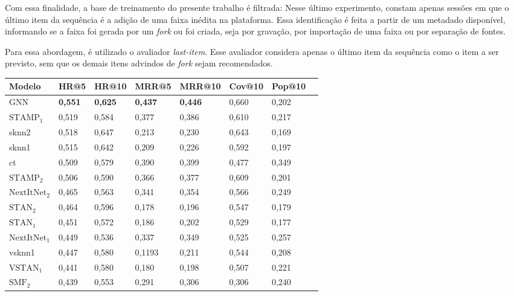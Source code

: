 Com essa finalidade, a base de treinamento do presente trabalho é filtrada:
Nesse último experimento, constam apenas sessões em que o último item da
sequência é a adição de uma faixa inédita na plataforma. Essa identificação é feita a partir
de um metadado disponível, informando se a faixa foi gerada por um \textit{fork}
ou foi criada, seja por gravação, por importação de uma faixa ou por separação
de fontes.

Para essa abordagem, é utilizado o avaliador \textit{last-item}. Esse avaliador
considera apenas o último item da sequência como o item a ser previsto, sem que
os demais itens advindos de \textit{fork} sejam recomendados.

\begin{table}[htbp]
  \small
  \centering
    \begin{tabular}{|l|l|l|l|l|l|l|l|}
      \hline
      Modelo & HR@5 & HR@10 & MRR@5 & MRR@10 & Cov@10 & Pop@10  \\
      \hline
      GNN & \textbf{0,551} & \textbf{0,625} & \textbf{0,437} & \textbf{0,446} & 0,660 & 0,202  \\
      \hline
      $\text{STAMP}_1$ & 0,519 & 0,584 & 0,377 & 0,386 & 0,610 & 0,217 \\
      \hline
      sknn2 & 0,518 & 0,647 & 0,213 & 0,230 & 0,643 & 0,169 \\
      \hline
      sknn1 & 0,515 & 0,642 & 0,209 & 0,226 & 0,592 & 0,197 \\
      \hline
      ct & 0,509 & 0,579 & 0,390 & 0,399  & 0,477 & 0,349 \\
      \hline
      $\text{STAMP}_2$ & 0,506 & 0,590 & 0,366 & 0,377 & 0,609 & 0,201 \\
      \hline
      $\text{NextItNet}_2$ & 0,465 & 0,563 & 0,341 & 0,354 & 0,566 & 0,249 \\
      \hline
      $\text{STAN}_2$ & 0,464 & 0,596 & 0,178 & 0,196 & 0,547 & 0,179 \\
      \hline
      $\text{STAN}_1$ & 0,451 & 0,572 & 0,186 & 0,202 & 0,529 & 0,177 \\
      \hline
      $\text{NextItNet}_1$ & 0,449 & 0,536 & 0,337 & 0,349 & 0,525 & 0,257\\
      \hline
      vsknn1 & 0,447 & 0,580 & 0,1193 & 0,211 & 0,544 & 0,208 \\
      \hline
      $\text{VSTAN}_1$ & 0,441 & 0,580 & 0,180 & 0,198 & 0,507 & 0,221 \\
      \hline
      $\text{SMF}_2$ & 0,439 & 0,553 & 0,291 & 0,306 & 0,306 & 0,240 \\

\end{tabular}
\end{table}
